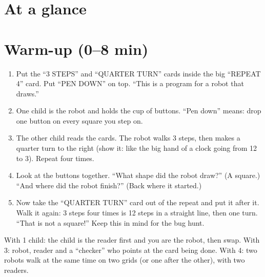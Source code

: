 \section{At a glance}
\begin{timeplan}
\end{timeplan}

\section{Warm-up (0--8 min)}
\begin{unplugged}
\begin{enumerate}[leftmargin=1.4em,itemsep=1pt]
  \item Put the \enquote{3 STEPS} and \enquote{QUARTER TURN} cards inside the big \enquote{REPEAT 4} card. Put \enquote{PEN DOWN} on top. \enquote{This is a program for a robot that draws.}
  \item One child is the robot and holds the cup of buttons. \enquote{Pen down} means: drop one button on every square you step on.
  \item The other child reads the cards. The robot walks 3 steps, then makes a quarter turn to the right (show it: like the big hand of a clock going from 12 to 3). Repeat four times.
  \item Look at the buttons together. \enquote{What shape did the robot draw?} (A square.) \enquote{And where did the robot finish?} (Back where it started.)
  \item Now take the \enquote{QUARTER TURN} card out of the repeat and put it after it. Walk it again: 3 steps four times is 12 steps in a straight line, then one turn. \enquote{That is not a square!} Keep this in mind for the bug hunt.
\end{enumerate}
With 1 child: the child is the reader first and you are the robot, then swap. With 3: robot, reader and a \enquote{checker} who points at the card being done. With 4: two robots walk at the same time on two grids (or one after the other), with two readers.
\end{unplugged}

